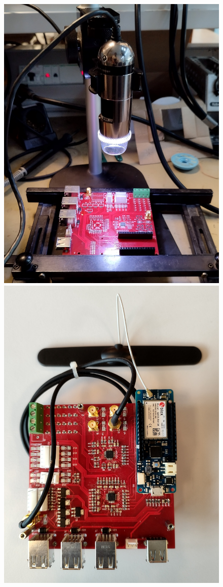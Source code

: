 \begin{figure}[htbp]
\centering
\includegraphics[scale=0.063]{images/Microscope.jpg}
\includegraphics[scale=0.0525]{images/Board.jpg}

\end{figure}
